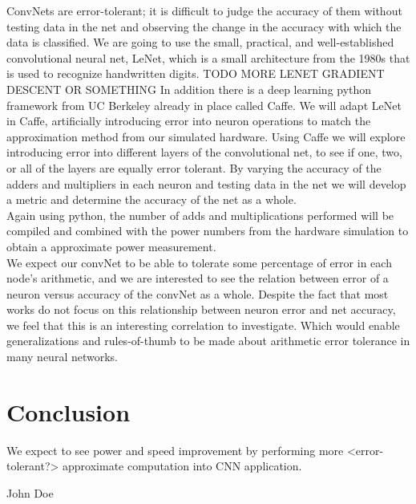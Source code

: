 \documentclass[conference]{IEEEtran}
\begin{document}
	\indent ConvNets are error-tolerant; it is difficult to judge the accuracy of them without testing data in the net and observing the change in  the accuracy with which the data is classified. We are going to use the small, practical, and well-established convolutional neural net, LeNet, which is a small architecture from the 1980s that is used to recognize handwritten digits. TODO MORE LENET GRADIENT DESCENT OR SOMETHING In addition there is a deep learning python framework from UC Berkeley already in place called Caffe. We will adapt LeNet in Caffe, artificially introducing error into neuron operations to match the approximation method from our simulated hardware. Using Caffe we will explore introducing error into different layers of the convolutional net, to see if one, two, or all of the layers are equally error tolerant. By varying the accuracy of the adders and multipliers in each neuron and testing data in the net we will develop a metric and determine the accuracy of the net as a whole.\\

	\indent Again using python, the number of adds and multiplications performed will be compiled and combined with the power numbers from the hardware simulation to obtain a approximate power measurement. \\

	\indent We expect our convNet to be able to tolerate some percentage of error in each node's arithmetic, and we are interested to see the relation between error of a neuron versus accuracy of the convNet as a whole. Despite the fact that most works do not focus on this relationship between neuron error and net accuracy, we feel that this is an interesting correlation to investigate. Which would enable generalizations and rules-of-thumb to be made about arithmetic error tolerance in many neural networks.\\
	

\section{Conclusion}
We expect to see power and speed improvement by performing more <error-tolerant?> approximate computation into CNN application.


\ifCLASSOPTIONcaptionsoff
  \newpage
\fi


\begin{IEEEbiography}{John Doe}
\blindtext
\end{IEEEbiography}
\end{document}
